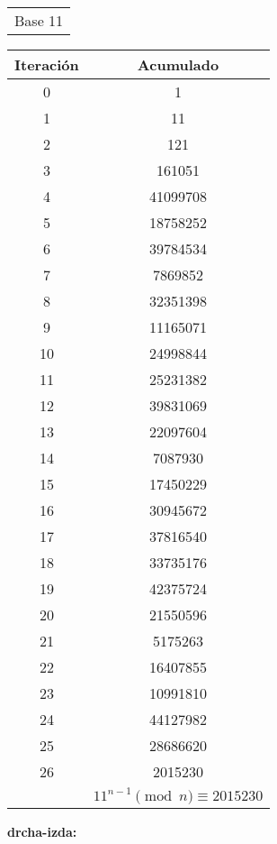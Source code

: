 \documentclass[fleqn]{article}
\begin{document}
        \begin{tabular}{c}
            Base 11 \\
        \end{tabular}
        \begin{tabular}{c | c}
            Iteración & Acumulado \\ \hline
            0 & 1 \\
            1 & 11  \\
            2 & 121     \\
            3 & 161051  \\
            4 & 41099708    \\
            5 & 18758252    \\
            6 & 39784534    \\
            7 & 7869852     \\
            8 & 32351398    \\
            9 & 11165071    \\
            10 & 24998844   \\
            11 & 25231382   \\
            12 & 39831069   \\
            13 & 22097604   \\
            14 & 7087930    \\
            15 & 17450229   \\
            16 & 30945672   \\
            17 & 37816540   \\
            18 & 33735176   \\
            19 & 42375724   \\
            20 & 21550596   \\
            21 & 5175263    \\
            22 & 16407855   \\
            23 & 10991810   \\
            24 & 44127982   \\
            25 & 28686620   \\
            26 & 2015230    \\ \hline
            & $ 11^{n-1} \pmod{n} \equiv  2015230 $
        \end{tabular}

    \newpage
    \textbf{drcha-izda:} %
\end{document}
